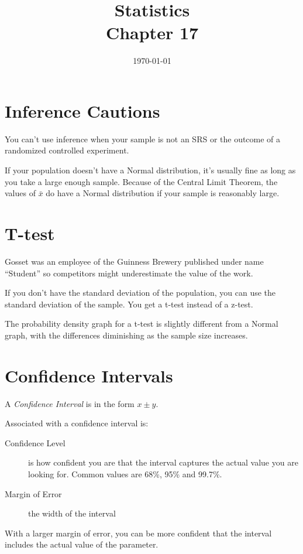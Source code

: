 \documentclass[letterpaper, landscape]{exam}
\title{Statistics \\ Chapter 17}
\date{\today}
\author{}
\begin{document}
  \maketitle
  \tableofcontents

  \section{Inference Cautions}
  You can't use inference when your sample is not an SRS or the outcome of a
  randomized controlled experiment.

  If your population doesn't have a Normal distribution, it's usually fine as
  long as you take a large enough sample. Because of the Central Limit Theorem,
  the values of $\bar{x}$ do have a Normal distribution if your sample is
  reasonably large.

  \section{T-test}
  Gosset was an employee of the Guinness Brewery published under name
  ``Student'' so competitors might underestimate the value of the work.

  If you don't have the standard deviation of the population, you can use the
  standard deviation of the sample. You get a t-test instead of a z-test.

  The probability density graph for a t-test is slightly different from a Normal
  graph, with the differences diminishing as the sample size increases.

  \section{Confidence Intervals}
  A {\em Confidence Interval\/} is in the form $x \pm y$.

  Associated with a confidence interval is:
  \begin{description}
    \item[Confidence Level] is how confident you are that the interval
      captures the actual value you are looking for. Common values are 68\%,
      95\% and 99.7\%.

    \item[Margin of Error] the width of the interval
  \end{description}

  With a larger margin of error, you can be more confident that the interval
  includes the actual value of the parameter.
\end{document}
